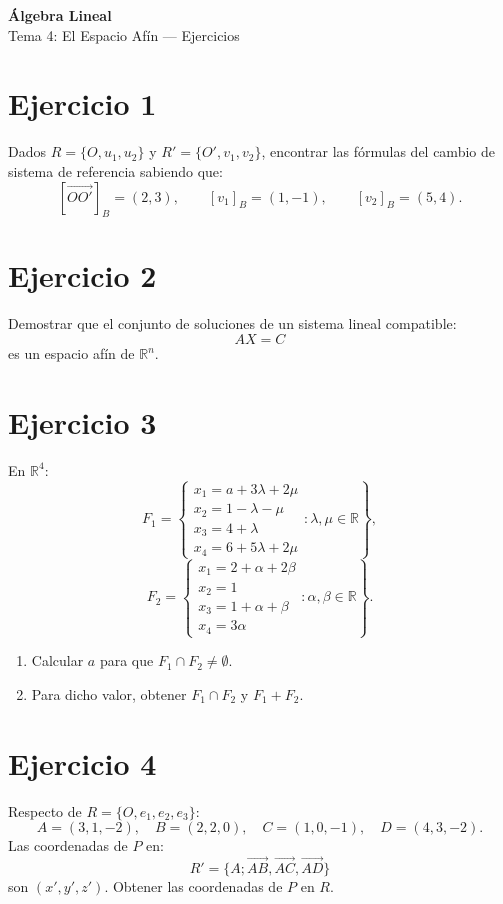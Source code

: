 \documentclass[11pt,a4paper]{article}
\newcommand{\R}{\mathbb{R}}
\begin{document}
\begin{center}
{\LARGE\bfseries Álgebra Lineal}\\[0.4em]
{\Large Tema 4: El Espacio Afín --- Ejercicios}
\end{center}

\section{Ejercicio 1}
Dados $R=\{O,u_1,u_2\}$ y $R'=\{O',v_1,v_2\}$, encontrar las fórmulas del cambio de sistema de referencia sabiendo que:
\[
[\overrightarrow{OO'}]_B=(2,3),
\qquad
[v_1]_B=(1,-1),
\qquad
[v_2]_B=(5,4).
\]

\section{Ejercicio 2}
Demostrar que el conjunto de soluciones de un sistema lineal compatible:
\[
AX=C
\]
es un espacio afín de $\R^n$.

\section{Ejercicio 3}
En $\R^4$:
\[
F_1=
\left\{
\begin{array}{l}
x_1=a+3\lambda+2\mu\\
x_2=1-\lambda-\mu\\
x_3=4+\lambda\\
x_4=6+5\lambda+2\mu
\end{array}
:
\lambda,\mu\in\R
\right\},
\]
\[
F_2=
\left\{
\begin{array}{l}
x_1=2+\alpha+2\beta\\
x_2=1\\
x_3=1+\alpha+\beta\\
x_4=3\alpha
\end{array}
:
\alpha,\beta\in\R
\right\}.
\]
\begin{enumerate}[label=\alph*)]
\item Calcular $a$ para que $F_1\cap F_2\neq\emptyset$.
\item Para dicho valor, obtener $F_1\cap F_2$ y $F_1+F_2$.
\end{enumerate}

\section{Ejercicio 4}
Respecto de $R=\{O,e_1,e_2,e_3\}$:
\[
A=(3,1,-2),\quad
B=(2,2,0),\quad
C=(1,0,-1),\quad
D=(4,3,-2).
\]
Las coordenadas de $P$ en:
\[
R'=\{A;\overrightarrow{AB},\overrightarrow{AC},\overrightarrow{AD}\}
\]
son $(x',y',z')$. Obtener las coordenadas de $P$ en $R$.
\end{document}
